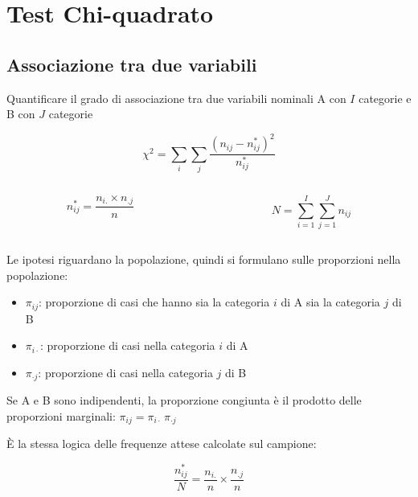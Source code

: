 \documentclass[
  ignorenonframetext,
  compress, aspectratio=149]{beamer}
\providecommand{\tightlist}{%
  \setlength{\itemsep}{0pt}\setlength{\parskip}{0pt}}
\begin{document}
\section{Test Chi-quadrato}\label{test-chi-quadrato}

\subsection{Associazione tra due
variabili}\label{associazione-tra-due-variabili}

\begin{frame}{}
\label{section}
\begin{tcolorbox}[enhanced jigsaw, opacitybacktitle=0.6, colframe=quarto-callout-tip-color-frame, arc=.35mm, colbacktitle=quarto-callout-tip-color!10!white, titlerule=0mm, breakable, colback=white, opacityback=0, coltitle=black, leftrule=.75mm, bottomtitle=1mm, toptitle=1mm, title={Scopo}, bottomrule=.15mm, rightrule=.15mm, toprule=.15mm, left=2mm]

Quantificare il grado di associazione tra due variabili nominali A con
\(I\) categorie e B con \(J\) categorie

\end{tcolorbox}

\[\chi^2 =  \sum_{i} \sum_{j} \displaystyle \frac{(n_{ij} - n_{ij}^*)^2}{n_{ij}^*}\]

\begin{columns}[T]
\begin{column}{0.5\linewidth}
\[n_{ij}^* = \dfrac{n_{i.} \times n_{.j}}{n}\]
\end{column}

\begin{column}{0.5\linewidth}
\[N = \sum_{i=1}^I \sum_{j=1}^J n_{ij}\]
\end{column}
\end{columns}
\end{frame}

\begin{frame}{}
\label{section-1}
Le ipotesi riguardano la popolazione, quindi si formulano sulle
proporzioni nella popolazione:

\begin{itemize}
\tightlist
\item
  \(\pi_{ij}\): proporzione di casi che hanno sia la categoria \(i\) di
  A sia la categoria \(j\) di B
\item
  \(\pi_{i\cdot}\): proporzione di casi nella categoria \(i\) di A
\item
  \(\pi_{\cdot j}\): proporzione di casi nella categoria \(j\) di B
\end{itemize}

Se A e B sono indipendenti, la proporzione congiunta è il prodotto delle
proporzioni marginali: \(\pi_{ij} = \pi_{i\cdot}\,\pi_{\cdot j}\)

È la stessa logica delle frequenze attese calcolate sul campione:

\[\dfrac{n_{ij}^*}{N} = \dfrac{n_{i.}}{n} \times \dfrac{n_{.j}}{n}\]
\end{frame}
\end{document}
